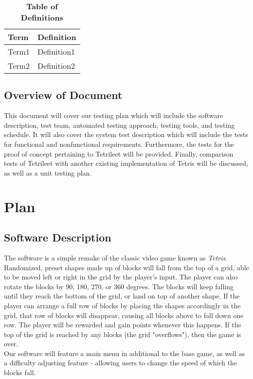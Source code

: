 \documentclass[12pt, titlepage]{article}
\begin{document}
\begin{table}[!htbp]
\caption{\textbf{Table of Definitions}} \label{Table}

\begin{tabularx}{\textwidth}{p{3cm}X}
\toprule
\textbf{Term} & \textbf{Definition}\\
\midrule
Term1 & Definition1\\
Term2 & Definition2\\
\bottomrule
\end{tabularx}

\end{table}	

\subsection{Overview of Document}
This document will cover our testing plan which will include the software description, test team, automated testing approach, testing tools, and testing schedule. It will also cover the system test description which will include the tests for functional and nonfunctional requirements. Furthermore, the tests for the proof of concept pertaining to Tetrileet will be provided. Finally, comparison tests of Tetrileet with another existing implementation of Tetris will be discussed, as well as a unit testing plan.   
\section{Plan}
	
\subsection{Software Description}

The software is a simple remake of the classic video game known as \emph{Tetris}. Randomized, preset shapes made up of blocks will fall from the top of a grid, able to be moved left or right in the grid by the player's input. The player can also rotate the blocks by 90, 180, 270, or 360 degrees. The blocks will keep falling until they reach the bottom of the grid, or land on top of another shape. If the player can arrange a full row of blocks by placing the shapes accordingly in the grid, that row of blocks will disappear, causing all blocks above to fall down one row. The player will be rewarded and gain points whenever this happens. If the top of the grid is reached by any blocks (the grid "overflows"), then the game is over.\\
Our software will feature a main menu in additional to the base game, as well as a difficulty adjusting feature - allowing users to change the speed of which the blocks fall.
\end{document}
